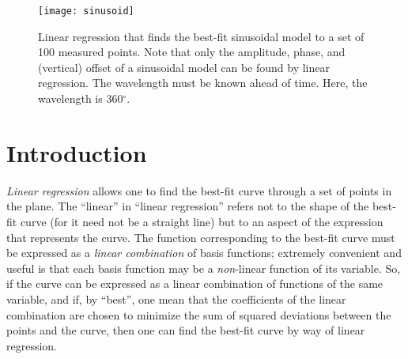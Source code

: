 \documentclass[twocolumn]{article}
\begin{document}
\thispagestyle{fancy}

%
%

\begin{figure}
   \begin{center}
      \texttt{[image: sinusoid]}
      \caption{%
         Linear regression that finds the best-fit sinusoidal model to a set of
         100 measured points.  Note that only the amplitude, phase, and
         (vertical) offset of a sinusoidal model can be found by linear
         regression. The wavelength must be known ahead of time. Here, the
         wavelength is 360$^\circ$.%
      }
      \label{fig:sinusoid}
   \end{center}
\end{figure}

\section{Introduction}

\emph{Linear regression} allows one to find the best-fit curve through a set of
points in the plane. The ``linear'' in ``linear regression'' refers not to the
shape of the best-fit curve (for it need not be a straight line) but to an
aspect of the expression that represents the curve. The function corresponding
to the best-fit curve must be expressed as a \emph{linear combination} of basis
functions; extremely convenient and useful is that each basis function may be a
\emph{non}-linear function of its variable.  So, if the curve can be expressed
as a linear combination of functions of the same variable, and if, by ``best'',
one mean that the coefficients of the linear combination are chosen to minimize
the sum of squared deviations between the points and the curve, then one can
find the best-fit curve by way of linear regression.
\end{document}
